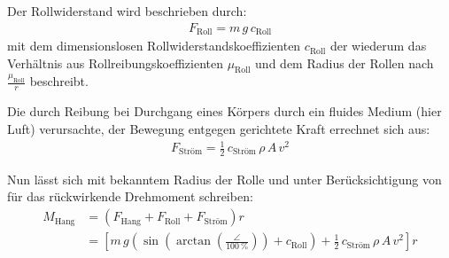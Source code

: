 	Der Rollwiderstand wird beschrieben durch:
	\begin{align}
		F_\text{Roll} = m \, g \, c_\text{Roll}
		\label{eq:rolling resistance}
	\end{align}%
	mit dem dimensionslosen Rollwiderstandskoeffizienten \(c_\text{Roll}\) der wiederum das Verhältnis aus Rollreibungskoeffizienten \(\mu_\text{Roll}\) und dem Radius der Rollen nach \(\frac{\mu_\text{Roll}}{r}\) beschreibt.\par\medskip
	Die durch Reibung bei Durchgang eines Körpers durch ein fluides Medium (hier Luft) verursachte, der Bewegung entgegen gerichtete Kraft errechnet sich aus:
	\begin{align}
		F_\text{Ström} = \frac{1}{2} \, c_\text{Ström} \, \rho \, A \, v^2
		\label{eq:air drag}
	\end{align}%

	Nun lässt sich mit bekanntem Radius der Rolle und unter Berücksichtigung von  für das rückwirkende Drehmoment schreiben:
	\begin{align}
		M_\text{Hang}	&= \left(F_\text{Hang} + F_\text{Roll} + F_\text{Ström}\right) r \nonumber \\
						&= \left[ m \, g \left( \sin\!\left(\arctan\!\left(\frac{\angle}{\qty{100}{\percent}}\right)\right) + c_\text{Roll} \right) + \frac{1}{2} \, c_\text{Ström} \, \rho \, A \, v^2 \right] r%
		\label{eq:incline plus roll plus drag torque}
	\end{align}%
